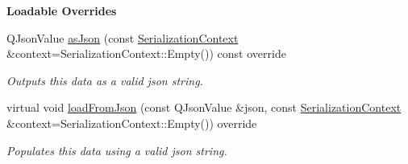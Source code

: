\begin{Indent}\textbf{ Loadable Overrides}\par
\begin{DoxyCompactItemize}
\item 
\mbox{\label{classrev_1_1_scenario_settings_a284196483c8ef954925aad3250ed5ee9}} 
Q\+Json\+Value \mbox{\hyperlink{classrev_1_1_scenario_settings_a284196483c8ef954925aad3250ed5ee9}{as\+Json}} (const \mbox{\hyperlink{structrev_1_1_serialization_context}{Serialization\+Context}} \&context=Serialization\+Context\+::\+Empty()) const override
\begin{DoxyCompactList}\small\item\em Outputs this data as a valid json string. \end{DoxyCompactList}\item 
\mbox{\label{classrev_1_1_scenario_settings_a291ffa550a427c78524353bf31655ee2}} 
virtual void \mbox{\hyperlink{classrev_1_1_scenario_settings_a291ffa550a427c78524353bf31655ee2}{load\+From\+Json}} (const Q\+Json\+Value \&json, const \mbox{\hyperlink{structrev_1_1_serialization_context}{Serialization\+Context}} \&context=Serialization\+Context\+::\+Empty()) override
\begin{DoxyCompactList}\small\item\em Populates this data using a valid json string. \end{DoxyCompactList}\end{DoxyCompactItemize}
\end{Indent}
